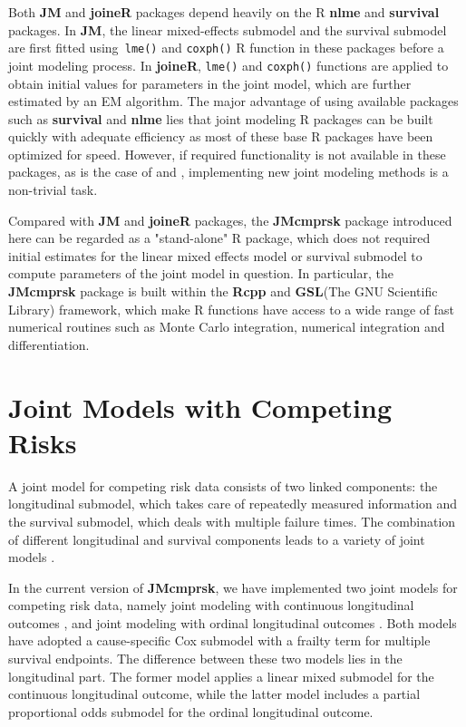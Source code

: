 Both \textbf{JM} and \textbf{joineR} packages depend heavily on the R \textbf{nlme} and \textbf{survival} packages. In \textbf{JM}, the linear mixed-effects submodel and the survival submodel are first fitted using\texttt{ lme()} and \texttt{coxph()} R function in these packages before a joint modeling process. In \textbf{joineR}, \texttt{lme()} and \texttt{coxph()} functions are applied to obtain initial values for parameters in the joint model, which are further estimated by an EM algorithm. The major advantage of using available packages such as \textbf{survival} and \textbf{nlme} lies that joint modeling R packages can be built quickly with adequate efficiency as most of these base R packages have been optimized for speed.  However, if required functionality is not available in these packages, as is the case of \cite{elashoff2008joint} and \cite{li2010joint}, implementing new joint modeling methods is a non-trivial task.

Compared with \textbf{JM} and \textbf{joineR} packages, the \textbf{JMcmprsk} package introduced here can be regarded as a "stand-alone" R package, which does not required initial estimates for the linear mixed effects model or survival submodel to compute parameters of the joint model in question. In particular, the \textbf{JMcmprsk} package is built within the \textbf{Rcpp} \citep{eddelbuettel2011rcpp} and \textbf{GSL}(The GNU Scientific Library)\citep{galassi2002gnu} framework, which make R functions have access to a wide range of fast numerical routines such as Monte Carlo integration, numerical integration and differentiation.

 \section{ Joint Models with Competing Risks }
 A joint model for competing risk data consists of two linked components: the longitudinal submodel, which takes care of repeatedly measured information and the survival submodel, which deals with multiple failure times. The combination of different longitudinal and survival components leads to a variety of joint models \citep{hickey2018comparison}.

 In the current version of \textbf{JMcmprsk}, we have implemented two joint models for competing risk data, namely joint modeling with continuous longitudinal outcomes \citep{elashoff2008joint}, and joint modeling with ordinal longitudinal outcomes \citep{li2010joint}. Both models have adopted a cause-specific Cox submodel with a frailty term for multiple survival endpoints. The difference between these two models lies in the longitudinal part.  The former model applies a linear mixed submodel for the continuous longitudinal outcome, while the latter model includes a partial proportional odds submodel for the ordinal longitudinal outcome.

